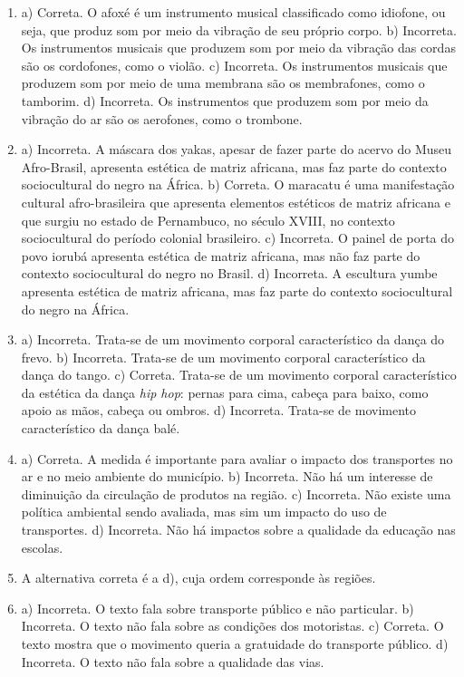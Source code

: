 \begin{enumerate}
\item
a) Correta. O afoxé é um instrumento musical classificado como idiofone,
ou seja, que produz som por meio da vibração de seu próprio corpo.
b) Incorreta. Os instrumentos musicais que produzem som por meio da
vibração das cordas são os cordofones, como o violão.
c) Incorreta. Os instrumentos musicais que produzem som por meio de uma
membrana são os membrafones, como o tamborim.
d) Incorreta. Os instrumentos que produzem som por meio da vibração do ar
são os aerofones, como o trombone.

\item
a) Incorreta. A máscara dos yakas, apesar de fazer parte do acervo do
Museu Afro-Brasil, apresenta estética de matriz africana, mas faz parte
do contexto sociocultural do negro na África.
b) Correta. O maracatu é uma manifestação cultural afro-brasileira que
apresenta elementos estéticos de matriz africana e que surgiu no estado
de Pernambuco, no século XVIII, no contexto sociocultural do período
colonial brasileiro.
c) Incorreta. O painel de porta do povo iorubá apresenta estética de
matriz africana, mas não faz parte do contexto sociocultural do negro no
Brasil.
d) Incorreta. A escultura yumbe apresenta estética de matriz africana,
mas faz parte do contexto sociocultural do negro na África.

\item
a) Incorreta. Trata-se de um movimento corporal característico da dança do frevo.
b) Incorreta. Trata-se de um movimento corporal característico da dança do tango.
c) Correta. Trata-se de um movimento corporal característico da estética da dança \textit{hip
hop}: pernas para cima, cabeça para baixo, como apoio as mãos, cabeça ou ombros.
d) Incorreta. Trata-se de movimento característico da dança balé.

\item
a) Correta. A medida é importante para avaliar o impacto dos transportes
no ar e no meio ambiente do município.
b) Incorreta. Não há um interesse de diminuição da circulação de
produtos na região.
c) Incorreta. Não existe uma política ambiental sendo avaliada, mas sim
um impacto do uso de transportes.
d) Incorreta. Não há impactos sobre a qualidade da educação nas escolas.

\item
A alternativa correta é a d), cuja ordem corresponde às regiões.

\item
a) Incorreta. O texto fala sobre transporte público e não particular.
b) Incorreta. O texto não fala sobre as condições dos motoristas.
c) Correta. O texto mostra que o movimento queria a gratuidade do
transporte público.
d) Incorreta. O texto não fala sobre a qualidade das vias.


\end{enumerate}
